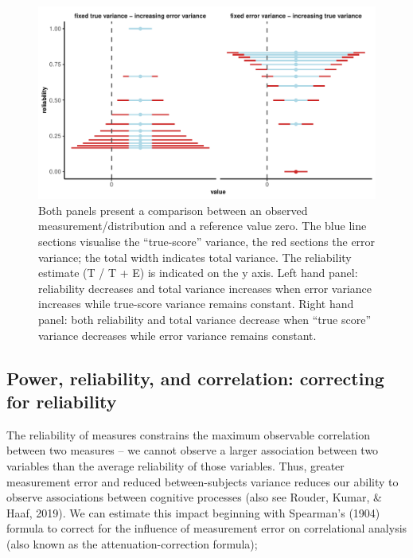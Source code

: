 \documentclass[english,,man,floatsintext]{apa6}
\begin{document}
\begin{figure}
\centering
\includegraphics{Parsons-Kruijt-Fox---reporting-reliability_files/figure-latex/figureone-1.pdf}
\caption{\label{fig:figureone}Both panels present a comparison between an observed measurement/distribution and a reference value zero. The blue line sections visualise the \enquote{true-score} variance, the red sections the error variance; the total width indicates total variance. The reliability estimate (T / T + E) is indicated on the y axis. Left hand panel: reliability decreases and total variance increases when error variance increases while true-score variance remains constant. Right hand panel: both reliability and total variance decrease when \enquote{true score} variance decreases while error variance remains constant.}
\end{figure}

\hypertarget{power-reliability-and-correlation-correcting-for-reliability}{%
\subsection{Power, reliability, and correlation: correcting for reliability}\label{power-reliability-and-correlation-correcting-for-reliability}}

The reliability of measures constrains the maximum observable correlation between two measures -- we cannot observe a larger association between two variables than the average reliability of those variables. Thus, greater measurement error and reduced between-subjects variance reduces our ability to observe associations between cognitive processes (also see Rouder, Kumar, \& Haaf, 2019). We can estimate this impact beginning with Spearman's (1904) formula to correct for the influence of measurement error on correlational analysis (also known as the attenuation-correction formula);
\end{document}
